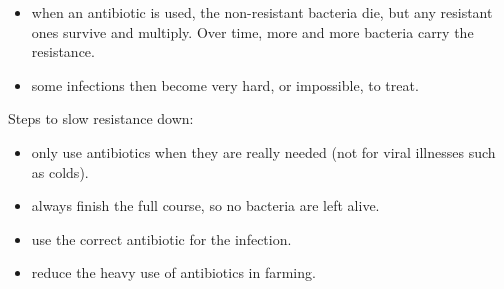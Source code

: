 \documentclass[11pt]{article}
\begin{document}
\begin{itemize}
\item when an antibiotic is used, the non-resistant bacteria die, but any resistant ones survive and multiply. Over time, more and more bacteria carry the resistance.

\item some infections then become very hard, or impossible, to treat.

\end{itemize}

Steps to slow resistance down:

\begin{itemize}
\item only use antibiotics when they are really needed (not for viral illnesses such as colds).

\item always finish the full course, so no bacteria are left alive.

\item use the correct antibiotic for the infection.

\item reduce the heavy use of antibiotics in farming.

\end{itemize}
\end{document}
